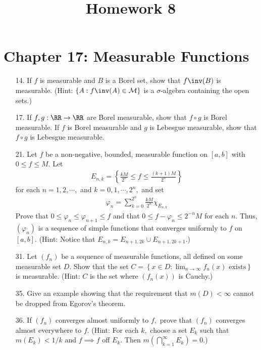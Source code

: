 \documentclass{article}
\begin{document}
\title{Homework 8}
\maketitle
\thispagestyle{fancy}

\section*{Chapter 17: Measurable Functions}

\begin{itemize}
	\item[14.] If $f$ is measurable and $B$ is a Borel set, show that $f\inv(B)$ is measurable. (Hint: $\left\{ A:f\inv(A)\in\mathcal M \right\}$ is a $\sigma$-algebra containing the open sets.)

	\item[17.] If $f, g:\RR\to\RR$ are Borel measurable, show that $f\circ g$ is Borel measurable. If $f$ is Borel measurable and $g$ is Lebesgue measurable, show that $f\circ g$ is Lebesgue measurable.

	\item[21.] Let $f$ be a non-negative, bounded, measurable function on $[a, b]$ with $0\le f\le M.$ Let 
		\begin{align*}
			E_{n, k} = \left\{ \frac{kM}{2^n}\le f\le \frac{(k+1)M}{2^n} \right\}
		\end{align*}
		for each $n=1, 2, \cdots,$ and $k=0, 1, \cdots, 2^n,$ and set
		\begin{align*}
			\varphi_n = \sum_{k=0}^{2^n} \frac{kM}{2^n} \chi_{E_{n, k}}
		\end{align*}
		Prove that $0\le \varphi_n\le \varphi_{n+1}\le f$ and that $0\le f-\varphi_n\le 2^{-n}M$ for each $n.$ Thus, $(\varphi_n)$ is a sequence of simple functions that converges uniformly to $f$ on $[a, b].$ (Hint: Notice that $E_{n, k}=E_{n+1, 2k}\cup E_{n+1, 2k+1}.$)

	\item[31.] Let $(f_n)$ be a sequence of measurable functions, all defined on some measurable set $D.$ Show that the set $C=\left\{ x\in D:\lim_{n\to\infty} f_n(x) \text{ exists}\right\}$ is measurable. (Hint: $C$ is the set where $(f_n(x))$ is Cauchy.)

	\item[35.] Give an example showing that the requirement that $m(D)<\infty$ cannot be dropped from Egorov's theorem.

	\item[36.] If $(f_n)$ converges almost uniformly to $f,$ prove that $(f_n)$ converges almost everywhere to $f.$ (Hint: For each $k,$ choose a set $E_k$ such that $m(E_k)<1/k$ and $f\implies f$ off $E_k.$ Then $m\left( \bigcap_{k=1}^\infty E_k \right)=0.$)
		
\end{itemize}
\end{document}
